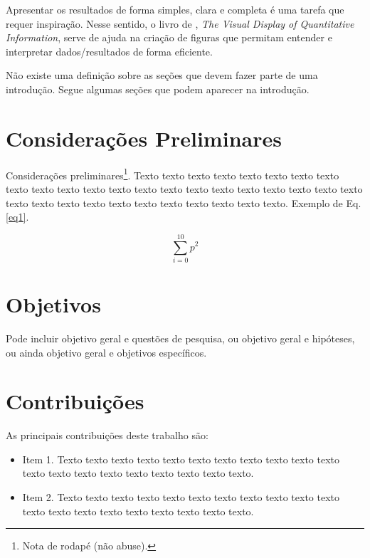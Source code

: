 Apresentar os resultados de forma simples, clara e completa é uma tarefa que
requer inspiração. Nesse sentido, o livro de \cite{Tufte2001},
\emph{The Visual Display of Quantitative Information}, serve de ajuda na 
criação de figuras que permitam entender e interpretar dados/resultados de forma
eficiente.

Não existe uma definição sobre as seções que devem fazer parte de uma introdução. Segue algumas seções que podem aparecer na introdução.

\section{Considerações Preliminares}
\label{sec:consideracoes_preliminares}

Considerações preliminares\footnote{Nota de rodapé (não abuse).}.
Texto texto texto texto texto texto texto texto texto texto texto texto texto
texto texto texto texto texto texto texto texto texto texto texto texto texto
texto texto texto texto texto texto texto. Exemplo de Eq.\ref {eq1}.

\begin{equation}
\label{eq1}
\sum_{i=0}^{10} p^2
\end{equation} 

\section{Objetivos}
\label{sec:objetivos}

Pode incluir objetivo geral e questões de pesquisa, ou objetivo geral e hipóteses, ou ainda objetivo geral e objetivos específicos.

\section{Contribuições}
\label{sec:contribuicoes}

As principais contribuições deste trabalho são:

\begin{itemize}
  \item Item 1. Texto texto texto texto texto texto texto texto texto texto
  texto texto texto texto texto texto texto texto texto texto.

  \item Item 2. Texto texto texto texto texto texto texto texto texto texto
  texto texto texto texto texto texto texto texto texto texto.

\end{itemize}

